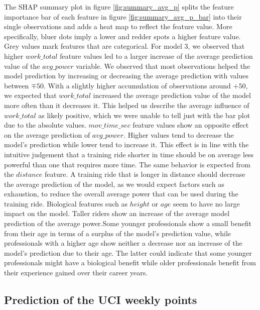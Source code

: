 \documentclass[12pt,a4paper]{article}
\begin{document}
The SHAP summary plot in figure \ref{fig:summary_avg_p} splits the feature importance bar of each feature in figure \ref{fig:summary_avg_p_bar} into their single observations and adds a heat map to reflect the feature value. More specifically, bluer dots imply a lower and redder spots a higher feature value. Grey values mark features that are categorical. For model 3, we observed that higher \(work\_total\) feature values led to a larger increase of the average prediction value of the \(avg\_power\) variable. We observed that most observations helped the model prediction by increasing or decreasing the average prediction with values between \(\mp 50\). With a slightly higher accumulation of observations around \(+50\), we expected that \(work\_total\) increased the average prediction value of the model more often than it decreases it. This helped us describe the average influence of \(work\_total\) as likely positive, which we were unable to tell just with the bar plot due to the absolute values. \(mov\_time\_sec\) feature values show an opposite effect on the average prediction of \(avg\_power\). Higher values tend to decrease the model's prediction while lower tend to increase it. This effect is in line with the intuitive judgement that a training ride shorter in time should be on average less powerful than one that requires more time. The same behavior is expected from the \(distance\) feature. A training ride that is longer in distance should decrease the average prediction of the model, as we would expect factors such as exhaustion, to reduce the overall average power that can be used during the training ride. Biological features such as \(height\) or \(age\) seem to have no large impact on the model. Taller riders show an increase of the average model prediction of the average power.Some younger professionals show a small benefit from their age in terms of a surplus of the model's prediction value, while professionals with a higher age show neither a decrease nor an increase of the model's prediction due to their age. The latter could indicate that some younger professionals might have a biological benefit while older professionals benefit from their experience gained over their career years.

\hypertarget{prediction-of-the-uci-weekly-points}{%
\subsection{Prediction of the UCI weekly points}\label{prediction-of-the-uci-weekly-points}}
\end{document}
